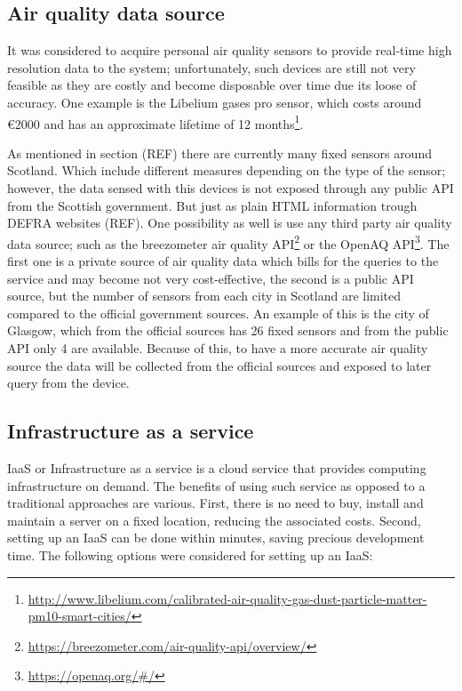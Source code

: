 \subsection{Air quality data source}
It was considered to acquire personal air quality sensors to provide real-time high resolution data to the system; unfortunately, such devices are still not very feasible as they are costly and become disposable over time due its loose of accuracy. One example is the Libelium gases pro sensor, which costs around \euro{}2000 and has an approximate lifetime of 12 months\footnote{\url{http://www.libelium.com/calibrated-air-quality-gas-dust-particle-matter-pm10-smart-cities/}}. 

As mentioned in section (REF) there are currently many fixed sensors around Scotland. Which include different measures depending on the type of the sensor; however, the data sensed with this devices is not exposed through any public API from the Scottish government. But just as plain HTML information trough DEFRA websites (REF). One possibility as well is use any third party air quality data source; such as the breezometer air quality API\footnote{\url{https://breezometer.com/air-quality-api/overview/}} or the OpenAQ API\footnote{\url{https://openaq.org/#/}}. The first one is a private source of air quality data which bills for the queries to the service and may become not very cost-effective, the second is a public API source, but the number of sensors from each city in Scotland are limited compared to the official government sources. An example of this is the city of Glasgow, which from the official sources has 26 fixed sensors and from the public API only 4 are available. Because of this, to have a more accurate air quality source the data will be collected from the official sources and exposed to later query from the device. 

\subsection{Infrastructure as a service}
IaaS or Infrastructure as a service is a cloud service that provides computing infrastructure on demand. The benefits of using such service as opposed to a traditional approaches are various. First, there is no need to buy, install and maintain a server on a fixed location, reducing the associated costs. Second, setting up an IaaS can be done within minutes, saving precious development time. The following options were considered for setting up an IaaS: 

